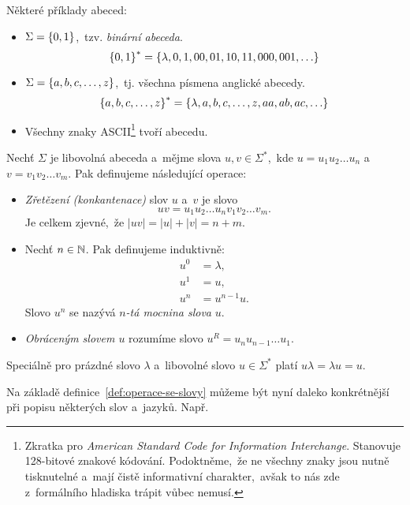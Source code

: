 \begin{example}
    Některé příklady abeced:
    \begin{itemize}
        \item $\Sigma=\left\{0,1\right\}$,~tzv. \emph{binární abeceda}.
        \[\left\{0,1\right\}^*=\left\{\lambda,0,1,00,01,10,11,000,001,\ldots\right\}\]
        \item $\Sigma=\left\{a,b,c,\ldots,z\right\}$,~tj. všechna písmena anglické abecedy.
        \[\left\{a,b,c,\ldots,z\right\}^*=\left\{\lambda,a,b,c,\ldots,z,aa,ab,ac,\ldots\right\}\]
        \item Všechny znaky ASCII\footnote{Zkratka pro \emph{American Standard Code for Information Interchange}. Stanovuje 128-bitové znakové kódování. Podoktněme,~že ne všechny znaky jsou nutně tisknutelné a~mají čistě informativní charakter,~avšak to nás zde z~formálního hladiska trápit vůbec nemusí.} tvoří abecedu.
    \end{itemize}
\end{example}
\begin{definition}\label{def:operace-se-slovy}
    Nechť $\Sigma$ je libovolná abeceda a~mějme slova $u,v\in\Sigma^*$,~kde $u=u_1u_2\ldots u_n$ a~$v=v_1v_2\ldots v_m$. Pak definujeme následující operace:
    \begin{itemize}
        \item \emph{Zřetězení (konkantenace)} slov $u$ a~$v$ je slovo
        \[uv=u_1u_2\ldots u_nv_1v_2\ldots v_m.\]
        Je celkem zjevné,~že $|uv|=|u|+|v|=n+m$.
        \item Nechť $n\in\mathbb{N}$. Pak definujeme induktivně:
        \begin{align*}
            u^0&=\lambda,\\
            u^1&=u,\\
            u^n&=u^{n-1}u.
        \end{align*}
        Slovo $u^n$ se nazývá \emph{$n$-tá mocnina slova} $u$.
        \item \emph{Obráceným slovem $u$} rozumíme slovo $u^R=u_nu_{n-1}\ldots u_1$.
    \end{itemize}
\end{definition}
\begin{remark}
    Speciálně pro prázdné slovo $\lambda$ a~libovolné slovo $u\in\Sigma^*$ platí $u\lambda=\lambda u=u$.
\end{remark}
Na základě definice~\ref{def:operace-se-slovy} můžeme být nyní daleko konkrétnější při popisu některých slov a~jazyků. Např.

